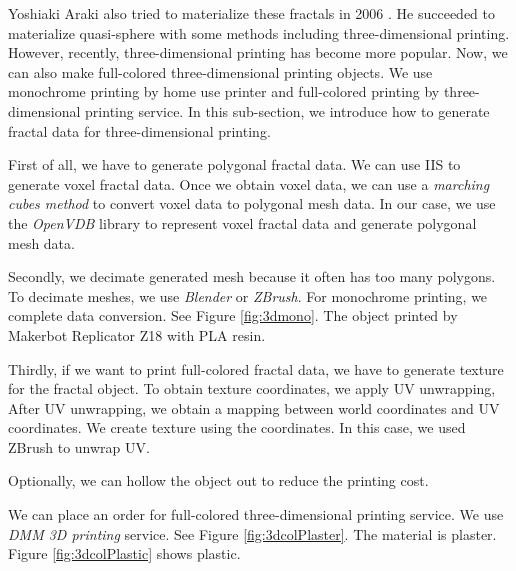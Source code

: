 Yoshiaki Araki also tried to materialize these fractals in 2006
\cite{araki2006materializing}.
He succeeded to materialize quasi-sphere with some methods including
three-dimensional printing.
However, recently, three-dimensional printing has become more popular.
Now, we can also make full-colored three-dimensional printing objects.
We use monochrome printing by home use printer and full-colored
printing by three-dimensional printing service.
In this sub-section, we introduce how to generate fractal data for
three-dimensional printing.

First of all, we have to generate polygonal fractal data.
We can use IIS to generate voxel fractal data.
Once we obtain voxel data, we can use a \textit{marching cubes method}
to convert voxel data to polygonal mesh data.
In our case, we use the \textit{OpenVDB} library to represent voxel
fractal data and generate polygonal mesh data.

Secondly, we decimate generated mesh because it often has
too many polygons. 
To decimate meshes, we use \textit{Blender} or \textit{ZBrush}.
For monochrome printing, we complete data conversion.
See Figure \ref{fig:3dmono}.
The object printed by Makerbot Replicator Z18 with PLA resin.

Thirdly, if we want to print full-colored fractal data, we have to generate
texture for the fractal object.
To obtain texture coordinates, we apply UV unwrapping,
After UV unwrapping, we obtain a mapping between world coordinates
and UV coordinates.
We create texture using the coordinates. 
In this case, we used ZBrush to unwrap UV.

Optionally, we can hollow the object out to reduce the printing cost.

We can place an order for full-colored three-dimensional printing service.
We use \textit{DMM 3D printing} service.
See Figure \ref{fig:3dcolPlaster}. The material is plaster.
Figure \ref{fig:3dcolPlastic} shows plastic.
